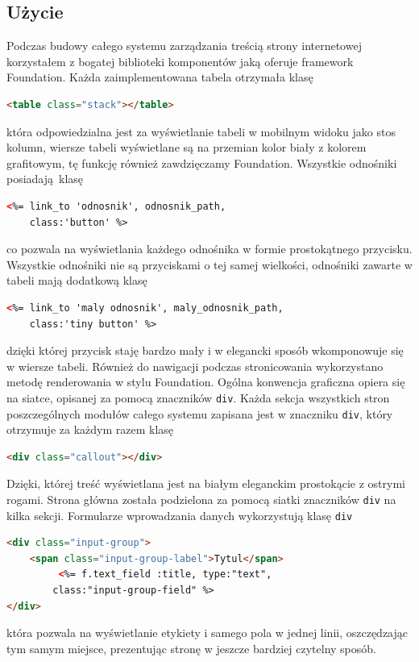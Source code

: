 \documentclass[openright]{xmgr}
\begin{document}
\subsection{Użycie}
Podczas budowy całego systemu zarządzania treścią strony internetowej korzystałem z bogatej biblioteki komponentów jaką oferuje framework Foundation. Każda zaimplementowana tabela otrzymała klasę 
\begin{lstlisting}[language=html, caption={Przykładowa tabela}]
<table class="stack"></table>
\end{lstlisting}
która odpowiedzialna jest za wyświetlanie tabeli w mobilnym widoku jako stos kolumn, wiersze tabeli wyświetlane są na przemian kolor biały z kolorem grafitowym, tę funkcję również  zawdzięczamy Foundation. Wszystkie odnośniki \mbox{posiadają klasę}
\begin{lstlisting}[language=html, caption={Przykladowy przycisk}]
<%= link_to 'odnosnik', odnosnik_path, 
	class:'button' %>
\end{lstlisting}
co pozwala na wyświetlania każdego odnośnika w formie prostokątnego przycisku. Wszystkie odnośniki nie są przyciskami o tej samej wielkości, odnośniki zawarte w tabeli mają dodatkową klasę 
\begin{lstlisting}[language=html, caption={Przykładowy mały przycisk}]
<%= link_to 'maly odnosnik', maly_odnosnik_path, 
	class:'tiny button' %>
\end{lstlisting}
dzięki której przycisk staję bardzo mały i w elegancki sposób wkomponowuje się w wiersze tabeli. Również do nawigacji podczas stronicowania wykorzystano metodę renderowania w stylu Foundation. Ogólna konwencja graficzna opiera się na siatce, opisanej za pomocą znaczników \texttt{div}. Każda sekcja wszystkich stron poszczególnych modułów całego systemu zapisana jest w znaczniku \texttt{div}, który otrzymuje za każdym razem klasę 
\begin{lstlisting}[language=html, caption={Przykładowy div}]
<div class="callout"></div>
\end{lstlisting}
Dzięki, której treść wyświetlana jest na białym eleganckim prostokącie z ostrymi rogami. Strona główna została podzielona za pomocą siatki znaczników \texttt{div} na kilka sekcji. Formularze wprowadzania danych wykorzystują klasę \texttt{div} 
\begin{lstlisting}[language=html, caption={Przykładowe pole tekstowe}]
<div class="input-group">
	<span class="input-group-label">Tytul</span>
         <%= f.text_field :title, type:"text", 
		class:"input-group-field" %>
</div>
\end{lstlisting}
która pozwala na wyświetlanie etykiety i samego pola w jednej linii, oszczędzając tym samym miejsce, prezentując stronę w jeszcze bardziej czytelny sposób.
\end{document}
